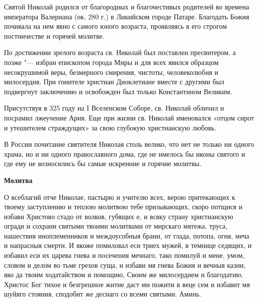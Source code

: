 \bigskip\bigskip\mychapterending

 

Святой Николай родился от благородных и благочестивых родителей во времена императора Валериана (ок. 280 г.) в Ликийском городе Патаре. Благодать Божия почивала на нем явно с самого юного возраста, проявляясь в его строгом постничестве и горячей молитве. 

По достижении зрелого возраста св. Николай был поставлен пресвитером, а позже "--- избран епископом города Миры и для всех явился образцом несокрушимой веры, безмерного смирения, чистоты, человеколюбия и милосердия. При гонителе христиан Диоклетиане вместе с другими был подвергнут заключению и освобожден был только Константином Великим. 

Присутствуя в 325 году на I Вселенском Соборе, св. Николай обличил и посрамил лжеучение Ария. Еще при жизни св. Николай именовался «отцом сирот и утешителем страждущих» за свою глубокую христианскую любовь. 

В России почитание святителя Николая столь велико, что нет не только ни одного храма, но и ни одного православного дома, где не имелось бы иконы святого и где ему не возносились бы самые искренние и горячие молитвы.


\medskip
\bfseries Молитва\normalfont{}


О всеблагий отче Николае, пастырю и учителю всех, верою притекающих к твоему заступлению и теплою молитвою тебе призывающих, скоро потщися и избави Христово стадо от волков, губящих е, и всяку страну христианскую огради и сохрани святыми твоими молитвами от мирскаго мятежа, труса, нашествия иноплеменников и междоусобныя брани, от глада, потопа, огня, меча и напрасныя смерти. И якоже помиловал еси триех мужей, в темнице седящих, и избавил еси их царева гнева и посечения мечнаго, тако помилуй и мене, умом, словом и делом во тьме грехов суща, и избави мя гнева Божия и вечныя казни, яко да твоим ходатайством и помощию, Своим же милосердием и благодатию, Христос Бог тихое и безгрешное житие даст ми пожити в веце сем и избавит мя шуйяго стояния, сподобит же деснаго со всеми святыми. Аминь.

 



\bigskip\bigskip\mychapterending

 
